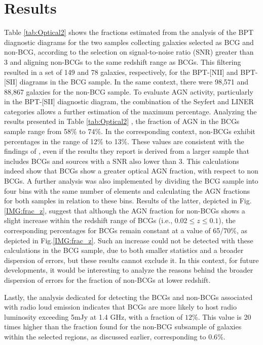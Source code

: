 \chapter{Results}
Table \ref{tab:Optical2} shows the fractions estimated from the analysis of the BPT diagnostic diagrams for the two samples collecting galaxies selected as BCG and non-BCG, according to the selection on signal-to-noise ratio (SNR) greater than 3 and aligning non-BCGs to the same redshift range as BCGs. This filtering resulted in a set of 149 and 78 galaxies, respectively, for the BPT-[NII] and BPT-[SII] diagrams in the BCG sample. In the same context, there were 98,571 and 88,867 galaxies for the non-BCG sample.
To evaluate AGN activity, particularly in the BPT-[SII] diagnostic diagram, the combination of the Seyfert and LINER categories allows a further estimation of the maximum percentage. Analyzing the results presented in Table \ref{tab:Optical2} , the fraction of AGN in the BCGs sample range from 58$\%$ to 74$\%$. In the corresponding context, non-BCGs exhibit percentages in the range of 12$\%$ to 13$\%$. These values are consistent with the findings of \cite{2012A&A...546A..17V}, even if the results they report is derived from a larger sample that includes BCGs and sources with a SNR also lower than 3.
This calculations indeed show that BCGs show a greater optical AGN fraction, with respect to non BCGs.
A further analysis was also implemented by dividing the BCG sample into four bins with the same number of elements and calculating the AGN fractions for both samples in relation to these bins.
Results of the latter, depicted in Fig.\ref{IMG:frac_z}, suggest that although the AGN fraction for non-BCGs shows a slight increase within the redshift range of BCGs (i.e., $0.02 \leq z \leq 0.1$), the corresponding percentages for BCGs remain constant at a value of 65/70$\%$, as depicted in Fig.\ref{IMG:frac_z}. Such an increase could not be detected with these calculations in the BCG sample, due to both smaller statistics and a broader dispersion of errors, but these results cannot exclude it. In this context, for future developments, it would be interesting to analyze the reasons behind the broader dispersion of errors for the fraction of non-BCGs at lower redshift.

Lastly, the analysis dedicated for detecting the BCGs and non-BCGs associated with radio loud emission indicates that BCGs are more likely to host radio luminosity exceeding 5mJy at 1.4 GHz, with a fraction of $12\%$. This value is 20 times higher than the fraction found for the non-BCG subsample of galaxies within the selected regions, as discussed earlier, corresponding to $0.6\%$.

